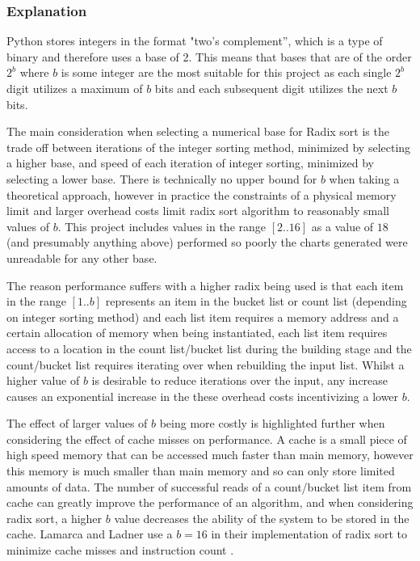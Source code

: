 \documentclass[12pt]{article}
\begin{document}
	\subsubsection{Explanation}
	\label{ssec:radixexplanation}
	Python stores integers in the format "two’s complement”, which is a type of binary and therefore uses a base of 2. This means that bases that are of the order $2^b$ where $b$ is some integer are the most suitable for this project as each single $2^b$ digit utilizes a maximum of $b$ bits and each subsequent digit utilizes the next $b$ bits.
	\par
	The main consideration when selecting a numerical base for Radix sort is the trade off between iterations of the integer sorting method, minimized by selecting a higher base, and speed of each iteration of integer sorting, minimized by selecting a lower base. There is technically no upper bound for $b$ when taking a theoretical approach, however in practice the constraints of a physical memory limit and larger overhead costs limit radix sort algorithm to reasonably small values of $b$. This project includes values in the range $[2..16]$ as a value of $18$ (and presumably anything above) performed so poorly the charts generated were unreadable for any other base.
	\par 
	The reason performance suffers with a higher radix being used is that each item in the range $[1..b]$ represents an item in the bucket list or count list (depending on integer sorting method) and each list item requires a memory address and a certain allocation of memory when being instantiated, each list item requires access to a location in the count list/bucket list during the building stage and the count/bucket list requires iterating over when rebuilding the input list. Whilst a higher value of $b$ is desirable to reduce iterations over the input, any increase causes an exponential increase in the these overhead costs incentivizing a lower $b$. 
	\par 
	The effect of larger values of $b$ being more costly is highlighted further when considering the effect of cache misses on performance. A cache is a small piece of high speed memory that can be accessed much faster than main memory, however this memory is much smaller than main memory and so can only store limited amounts of data. The number of successful reads of a count/bucket list item from cache can greatly improve the performance of an algorithm, and when considering radix sort, a higher $b$ value decreases the ability of the system to be stored in the cache. Lamarca and Ladner use a $b = 16$ in their implementation of radix sort to minimize cache misses and instruction count \cite{LAMARCA199966}.
\end{document}
